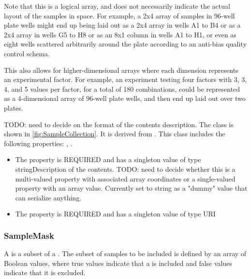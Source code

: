         Note that this is a logical array, and does not necessarily indicate the actual layout of the samples in space.
        For example, a 2x4 array of samples in 96-well plate wells might end up being laid out as a 2x4 array in wells
        A1 to B4 or as a 2x4 array in wells G5 to H8 or as an 8x1 column in wells A1 to H1, or even as eight wells
        scattered arbitrarily around the plate according to an anti-bias quality control schema.

        This also allows for higher-dimensional arrays where each dimension represents an experimental factor.
        For example, an experiment testing four factors with 3, 3, 4, and 5 values per factor, for a total of 180
        combinations, could be represented as a 4-dimensional  array of 96-well plate wells, and then end up
        laid out over two plates.

        TODO: need to decide on the format of the contents description.%
\newline%
\linebreak%
The  class is shown in \ref{fig:SampleCollection}. It is derived from .%
This class includes the following properties: , . %
\begin{itemize}%
\item%
The  property is REQUIRED and has a singleton value of type stringDescription of the contents.
        TODO: need to decide whether this is a multi-valued property with associated array coordinates or a
        single-valued property with an array value.
        Currently set to string as a "dummy" value that can serialize anything.%
\item%
The  property is REQUIRED and has a singleton value of type URI%
\end{itemize}%
\subsubsection{SampleMask}%
\label{sec:paml:SampleMask}%
A  is a subset of a . The subset of samples to be included is defined
        by an array of Boolean values, where true values indicate that a  is included and false values indicate
        that it is excluded.

